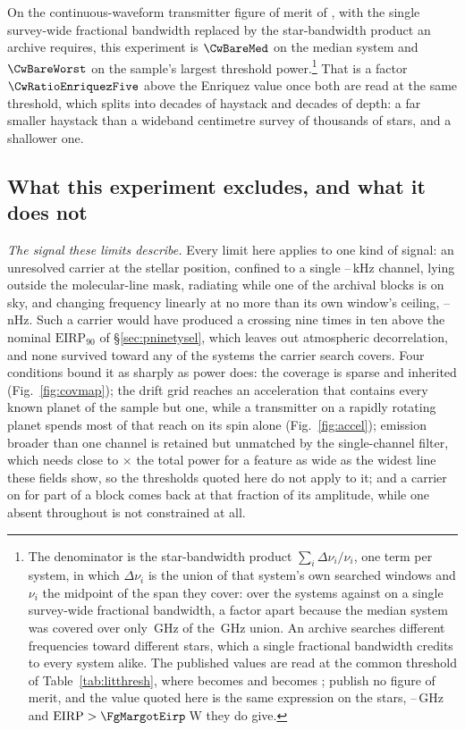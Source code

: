 On the continuous-waveform transmitter figure of merit of
\citet{Enriquez2017}, with the single survey-wide fractional bandwidth
replaced by the star-bandwidth product an archive requires, this experiment
is $\CwBareMed$ on the median system and $\CwBareWorst$ on the sample's
largest threshold power.\footnote{The denominator is the star-bandwidth
product $\sum_{i}\Delta\nu_{i}/\nu_{i}$, one term per system, in which
$\Delta\nu_{i}$ is the union of that system's own searched windows and
$\nu_{i}$ the midpoint of the span they cover: \CwSigma{} over the
\CwNSys{} systems against \CwUniform{} on a single survey-wide fractional
bandwidth, a factor \CwRatio{} apart because the median system was covered
over only \SysUnionAMed\,GHz of the \CvUnionA\,GHz union. An archive
searches different frequencies toward different stars, which a single
fractional bandwidth credits to every system alike. The published values are
read at the common threshold of Table~\ref{tab:litthresh}, where
\FomLitEnriquez{} becomes \FomLitEnriquezFive{} and \FgLitMargot{} becomes
\FgLitMargotFive; \citet{Margot2023} publish no figure of merit, and the
value quoted here is the same expression on the \FomMargotN{} stars,
\FomMargotLo--\FomMargotHi\,GHz and $\mathrm{EIRP}>\FgMargotEirp$\,W
they do give.} That is a factor $\CwRatioEnriquezFive$ above the
Enriquez value once both are read at the same threshold, which splits into
\CwBandDex{} decades of haystack and \CwEirpDex{} decades of depth: a far
smaller haystack than a wideband centimetre survey of thousands of stars,
and a shallower one.

\subsection{What this experiment excludes, and what it does not}
\label{sec:excludes}

\noindent\emph{The signal these limits describe.} Every limit here applies to
one kind of signal: an unresolved carrier at the stellar position, confined to
a single \ChanLoA--\ChanHiA\,kHz channel, lying outside the molecular-line
mask, radiating while one of the archival blocks is on sky, and changing
frequency linearly at no more than its own window's ceiling,
\DriftCeilLo--\DriftCeilHi\,nHz. Such a carrier would
have produced a crossing nine times in ten above the nominal
$\mathrm{EIRP}_{90}$ of \S\ref{sec:pninetysel}, which leaves out
atmospheric decorrelation, and none survived toward any of the \NSysClassA{}
systems the carrier search covers. Four conditions
bound it as sharply as power does: the coverage is sparse and
inherited (Fig.~\ref{fig:covmap}); the drift grid reaches an acceleration that contains every
known planet of the sample but one, while a transmitter on a rapidly rotating
planet spends most of that reach on its spin alone (Fig.~\ref{fig:accel}); emission broader than one channel is
retained but unmatched by the single-channel filter, which needs close to
\ScNBroadRatio$\times$ the total power for a feature as wide as the widest line these
fields show, so the thresholds quoted here do not apply to it; and a carrier on for part of a block comes
back at that fraction of its amplitude, while one absent throughout is not
constrained at all.

